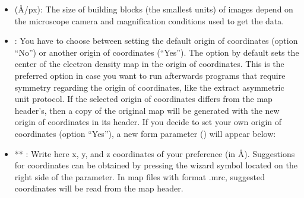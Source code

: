 \begin{itemize}
\begin{itemize}
\begin{itemize}
\begin{itemize}
                                \item {} (\AA/px): The size of building blocks (the smallest units) of images depend on the microscope camera and magnification conditions used to get the data.
                                \item {}: You have to choose between setting the default origin of coordinates (option ``No'') or another origin of coordinates (``Yes''). The option by default sets the center of the electron density map in the origin of coordinates. This is the preferred option in case you want to run afterwards programs that require symmetry regarding the origin of coordinates, like the extract asymmetric unit protocol. If the selected origin of coordinates differs from the map header's, then a copy of the original map will be generated with the new origin of coordinates in its header. If you decide to set your own origin of coordinates (option ``Yes''), a new form parameter () will appear below:
                                    
                                    \item ** : Write here x, y, and z coordinates of your preference (in \AA). Suggestions for coordinates can be obtained by pressing the wizard symbol located on the right side of the  parameter. In map files with format .mrc, suggested coordinates will be read from the map header.
                                    
                               \end{itemize}
                    

\end{itemize}
\end{itemize}
\end{itemize}

